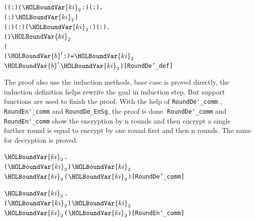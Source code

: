 \documentclass{article}
\begin{document}
\begin{alltt}
\HOLTokenTurnstile{} (\HOLSymConst{\HOLTokenForall{}}( :) (\ensuremath{\HOLBoundVar{ki}\sb{\mathrm{2}}} :) ( :).
       ( :)  \ensuremath{\HOLBoundVar{ki}\sb{\mathrm{2}}}  \HOLSymConst{=} ) \HOLSymConst{\HOLTokenConj{}}
   \HOLSymConst{\HOLTokenForall{}}( :) ( :) (\ensuremath{\HOLBoundVar{ki}\sb{\mathrm{2}}} :) ( :).
      ( )  \ensuremath{\HOLBoundVar{ki}\sb{\mathrm{2}}}  \HOLSymConst{=}
     (
        (\ensuremath{\HOLBoundVar{b}\sp{\prime{}}} :) =    \ensuremath{\HOLBoundVar{ki}\sb{\mathrm{2}}} 
         \ensuremath{\HOLBoundVar{b}\sp{\prime{}}}  \ensuremath{\HOLBoundVar{ki}\sb{\mathrm{2}}})\hfill{[RoundDe'_def]}
\end{alltt}

The proof also use the induction methods, base case is proved directly, the induction definition helps rewrite the goal in induction step.
But support functions are used to finish the proof. With the help of \verb|RoundDe'_comm| , \verb|RoundEn'_comm| and \verb|RoundDe_EnSg|,
the proof is done. \verb|RoundDe'_comm| and \verb|RoundEn'_comm| show the encryption by n rounds and then encrypt a single further round
is equal to encrypt by one round first and then n rounds. The same for decryption is proved.

\begin{alltt}
\HOLTokenTurnstile{} \HOLSymConst{\HOLTokenForall{}}    \ensuremath{\HOLBoundVar{ki}\sb{\mathrm{2}}}.
      (   \ensuremath{\HOLBoundVar{ki}\sb{\mathrm{2}}} )  \ensuremath{\HOLBoundVar{ki}\sb{\mathrm{2}}} \HOLSymConst{=}
        \ensuremath{\HOLBoundVar{ki}\sb{\mathrm{2}}} (   \ensuremath{\HOLBoundVar{ki}\sb{\mathrm{2}}})\hfill{[RoundDe'_comm]}
\end{alltt}

\begin{alltt}
\HOLTokenTurnstile{} \HOLSymConst{\HOLTokenForall{}}    \ensuremath{\HOLBoundVar{ki}\sb{\mathrm{2}}}.
      (   \ensuremath{\HOLBoundVar{ki}\sb{\mathrm{2}}} )  \ensuremath{\HOLBoundVar{ki}\sb{\mathrm{2}}} \HOLSymConst{=}
        \ensuremath{\HOLBoundVar{ki}\sb{\mathrm{2}}} (   \ensuremath{\HOLBoundVar{ki}\sb{\mathrm{2}}})\hfill{[RoundEn'_comm]}
\end{alltt}
\end{document}

